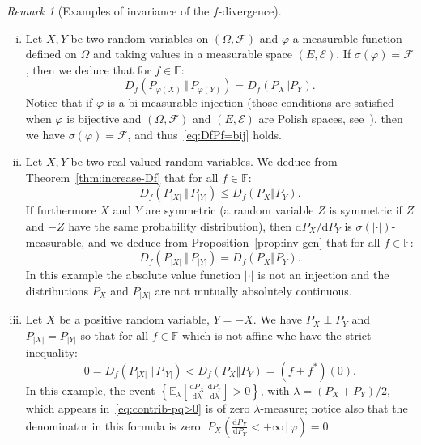 \documentclass[12pt]{article}
\newcommand{\ce}{{\mathcal E}}
\newcommand{\cf}{{\mathcal F}}
\newcommand{\E}{{\mathbb E}}
\newcommand{\F}{{\mathbb F}}
\newcommand{\rd}{\mathrm{d}}
\theoremstyle{plain}
\theoremstyle{remark}
\newtheorem{rem}{Remark}
\begin{document}
\begin{rem}[Examples of invariance of the $f$-divergence]
  \label{rem:inv-gen}
  $ $
  \begin{enumerate}[(i)]
  \item
    \label{item:inv-gen-sf=f}
    Let  $X,Y$ be two
     random variables on $(\Omega, \cf)$ and  $\varphi$  a measurable
     function  defined on $\Omega$ and taking values in a measurable
     space $(E, \ce)$.
If  $\sigma(\varphi)=\cf$, then we deduce that for $f\in \F$:
  \begin{equation}
   \label{eq:DfPf=bij}
          D_f( P_{\varphi(X)} \, \Vert \,  P_{\varphi(Y)}) = D_f(P_X \Vert P_Y ).
     \end{equation}
     Notice  that  if  $\varphi$  is a  bi-measurable  injection  (those
     conditions   are  satisfied   when  $\varphi$   is  bijective   and
     $(\Omega,        \cf)$  and $(E, \ce)$ are       Polish        spaces,
     see~\cite{purves1966bimeasurable}),       then        we       have
     $\sigma(\varphi)=\cf$, and thus~\eqref{eq:DfPf=bij} holds.


      \item Let $X,Y$ be two  real-valued
     random variables. We deduce from Theorem~\ref{thm:increase-Df}
     that for all $f\in \F$:
     \[
          D_f( P_{|X|} \, \Vert \,  P_{|Y|}) \leq  D_f(P_X \Vert P_Y ).
        \]
        If furthermore $X$ and $Y$  are symmetric (a random variable $Z$
        is  symmetric  if  $Z$  and   $-Z$  have  the  same  probability
        distribution), then
        $\rd P_X/ \rd P_Y$  is $\sigma(|\cdot|)$-measurable, and we
        deduce from Proposition~\ref{prop:inv-gen}  that
        for all $f\in \F$:
 \[
         D_f( P_{|X|} \, \Vert \,  P_{|Y|})=D_f(P_X \Vert P_Y ).
      \]
      In this  example the absolute  value function $|\cdot|$ is  not an
      injection  and  the  distributions  $P_X$ and  $P_{|X|}$  are  not
      mutually absolutely continuous.

    \item Let $X$ be a positive random variable,  $Y=-X$. We have $P_X
      \perp P_Y$ and $P_{|X|}=P_{|Y|}$ so that
  for all $f\in \F$ which is not affine whe have the strict inequality:
\[
 0=        D_f( P_{|X|} \, \Vert \,  P_{|Y|})<D_f(P_X \Vert P_Y )=(f+f^*)(0).
      \]
      In           this           example,           the           event
      $  \left\{\E_\lambda\left[\frac{\rd P_X}{\rd  \lambda}\, \frac{\rd
            P_Y}{\rd       \lambda}\right]>0       \right\}$,       with
      $\lambda=(P_X+  P_Y)/2$, which  appears in~\eqref{eq:contrib-pq>0}
      is  of  zero  $\lambda$-measure;  notice  also  that the
      denominator       in       this       formula       is       zero:
      $P_X\left(\frac{\rd     P_X}{\rd    P_Y}<+\infty     \,    \big     |\,
        \varphi\right)=0$.







  \end{enumerate}
\end{rem}
\end{document}
